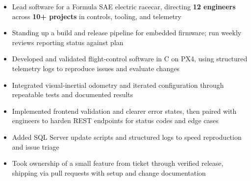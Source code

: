 \documentclass[10pt,letterpaper]{article}
\begin{document}
\bodyfont

\resumeheader
\educationsection




\orgline{\spartanracing}
\begin{itemize}
  \item Lead software for a Formula SAE electric racecar, directing \textbf{12 engineers} across \textbf{10+ projects} in controls, tooling, and telemetry
  \item Standing up a build and release pipeline for embedded firmware; run weekly reviews reporting status against plan
\end{itemize}

\entryspace

\begin{itemize}
  \item Developed and validated flight-control software in C on PX4, using structured telemetry logs to reproduce issues and evaluate changes
  \item Integrated visual-inertial odometry and iterated configuration through repeatable tests and documented results
\end{itemize}

\entryspace

\begin{itemize}
  \item Implemented frontend validation and clearer error states, then paired with engineers to harden REST endpoints for status codes and edge cases
  \item Added SQL Server update scripts and structured logs to speed reproduction and issue triage
  \item Took ownership of a small feature from ticket through verified release, shipping via pull requests with setup and change documentation
\end{itemize}
\end{document}
